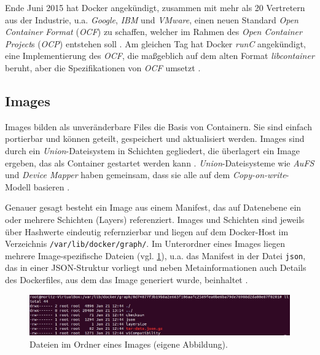 \documentclass[../main.tex]{subfiles}
\begin{document}
			Ende Juni 2015 hat Docker angekündigt, zusammen mit mehr als 20 Vertretern aus der Industrie, u.a. \emph{Google}, \emph{IBM} und \emph{VMware}, einen neuen Standard \emph{Open Container Format} (\emph{\acrshort{OCF}}) zu schaffen, welcher im Rahmen des \emph{Open Container Project}s (\emph{\acrshort{OCP}}) entstehen soll \cite{dockerOCP}. Am gleichen Tag hat Docker \emph{runC} angekündigt, eine Implementierung des \emph{\acrshort{OCF}}, die maßgeblich auf dem alten Format \emph{libcontainer} beruht, aber die Spezifikationen von \emph{\acrshort{OCF}} umsetzt \cite{dockerRunC}\cite{dockerRunCGithub}\cite{runC}.

		\subsection{Images}
    \label{dockerImages}
			Images bilden als unveränderbare Files die Basis von Containern. Sie sind einfach portierbar und können geteilt, gespeichert und aktualisiert werden. Images sind durch ein \emph{Union}-Dateisystem in Schichten gegliedert, die überlagert ein Image ergeben, das als Container gestartet werden kann \cite[S.11]{dockerBook}. \emph{Union}-Dateisysteme wie \emph{AuFS} und \emph{Device Mapper} haben gemeinsam, dass sie alle auf dem \emph{Copy-on-write}-Modell basieren \cite[S.8]{dockerBook}\cite[S.3]{dockerIntroIEEE}\cite[S.4]{dockerSecIntro}.

			Genauer gesagt besteht ein Image aus einem Manifest, das auf Datenebene ein oder mehrere Schichten (Layers) referenziert. Images und Schichten sind jeweils über Hashwerte eindeutig refernzierbar und liegen auf dem Docker-Host im Verzeichnis \texttt{/var/lib/docker/graph/}. Im Unterordner eines Images liegen mehrere Image-spezifische Dateien (vgl. \fig \ref{fig:intro_dockerImageVZ}), u.a. das Manifest in der Datei \texttt{json}, das in einer \acrshort{JSON}-Struktur vorliegt und neben Metainformationen auch Details des Dockerfiles, aus dem das Image generiert wurde, beinhaltet \cite{githubDockerGlossary}.

			\begin{figure}[!htbp]
          \centering
          \includegraphics[width=1.0\textwidth]{./images/intro_dockerImageVZ.jpg}
          \caption{Dateien im Ordner eines Images (eigene Abbildung).}
          \label{fig:intro_dockerImageVZ}
      \end{figure}
\end{document}
